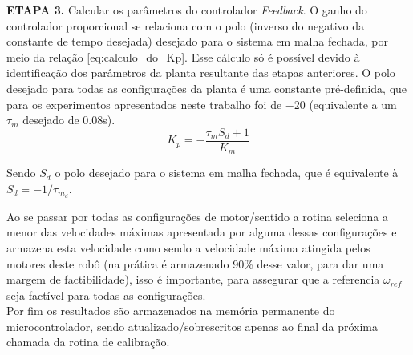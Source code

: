\textbf{ETAPA 3.} Calcular os parâmetros do controlador \textit{Feedback}. O ganho do controlador proporcional se relaciona com o polo (inverso do negativo da constante de tempo desejada) desejado para o sistema em malha fechada, por meio da relação \ref{eq:calculo_do_Kp}. Esse cálculo só é possível devido à identificação dos parâmetros da planta resultante das etapas anteriores. O polo desejado para todas as configurações da planta é uma constante pré-definida, que para os experimentos apresentados neste trabalho foi de $-20$ (equivalente a um $\tau_m$ desejado de 0.08s).\\

\begin{equation}
    K_p = -\frac{\tau_m S_d + 1}{K_m}
    \label{eq:calculo_do_Kp}
\end{equation}

Sendo $S_d$ o polo desejado para o sistema em malha fechada, que é equivalente à $S_d = -1/\tau_{m_{d}}$.
    

Ao se passar por todas as configurações de motor/sentido a rotina seleciona a menor das velocidades máximas apresentada por alguma dessas configurações e armazena esta velocidade como sendo a velocidade máxima atingida pelos motores deste robô (na prática é armazenado 90\% desse valor, para dar uma margem de factibilidade), isso é importante, para assegurar que a referencia $\omega_{ref}$ seja factível para todas as configurações. \\

Por fim os resultados são armazenados na memória permanente do microcontrolador, sendo atualizado/sobrescritos apenas ao final da próxima chamada da rotina de calibração.